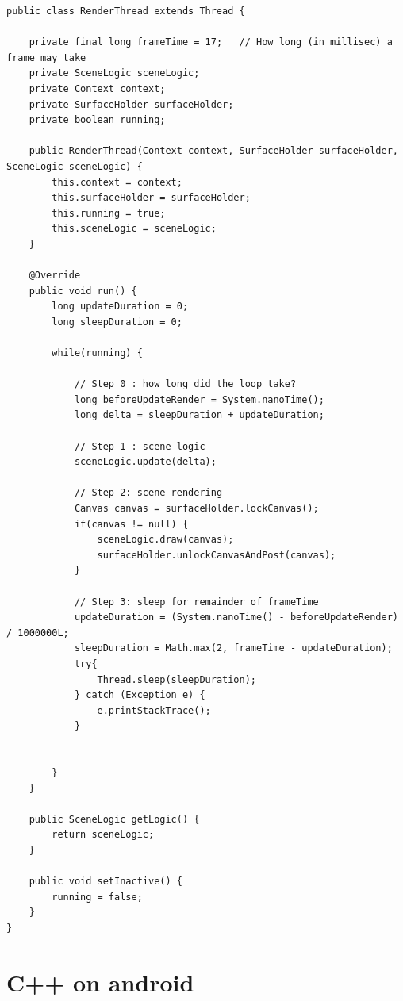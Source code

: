 \begin{lstlisting}
public class RenderThread extends Thread {

    private final long frameTime = 17;   // How long (in millisec) a frame may take
    private SceneLogic sceneLogic;
    private Context context;
    private SurfaceHolder surfaceHolder;
    private boolean running;

    public RenderThread(Context context, SurfaceHolder surfaceHolder, SceneLogic sceneLogic) {
        this.context = context;
        this.surfaceHolder = surfaceHolder;
        this.running = true;
        this.sceneLogic = sceneLogic;
    }

    @Override
    public void run() {
        long updateDuration = 0;
        long sleepDuration = 0;

        while(running) {

            // Step 0 : how long did the loop take?
            long beforeUpdateRender = System.nanoTime();
            long delta = sleepDuration + updateDuration;

            // Step 1 : scene logic
            sceneLogic.update(delta);

            // Step 2: scene rendering
            Canvas canvas = surfaceHolder.lockCanvas();
            if(canvas != null) {
                sceneLogic.draw(canvas);
                surfaceHolder.unlockCanvasAndPost(canvas);
            }

            // Step 3: sleep for remainder of frameTime
            updateDuration = (System.nanoTime() - beforeUpdateRender) / 1000000L;
            sleepDuration = Math.max(2, frameTime - updateDuration);
            try{
                Thread.sleep(sleepDuration);
            } catch (Exception e) {
                e.printStackTrace();
            }


        }
    }

    public SceneLogic getLogic() {
        return sceneLogic;
    }

    public void setInactive() {
        running = false;
    }
}
\end{lstlisting}





\section{C++ on android}



